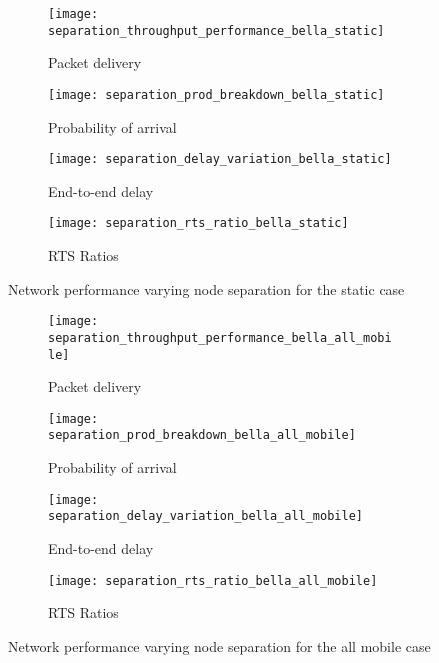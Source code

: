 \begin{figure}[tp!]
  \begin{subfigure}[t]{0.5\textwidth}
    \centering
    \texttt{[image: separation\_throughput\_performance\_bella\_static]}
    \caption{Packet delivery}
    \label{fig:separation_throughput_performance_bella_static}
  \end{subfigure}
  \begin{subfigure}[t]{0.5\textwidth}
    \centering
    \texttt{[image: separation\_prod\_breakdown\_bella\_static]}
    \caption{Probability of arrival}
    \label{fig:separation_prod_breakdown_bella_static}
  \end{subfigure}

  \begin{subfigure}[t]{0.5\textwidth}
    \centering
    \texttt{[image: separation\_delay\_variation\_bella\_static]}
    \caption{End-to-end delay}
    \label{fig:separation_delay_variation_bella_static}
  \end{subfigure}
  \begin{subfigure}[t]{0.5\textwidth}
    \centering
    \texttt{[image: separation\_rts\_ratio\_bella\_static]}
    \caption{RTS Ratios}
    \label{fig:separation_rts_ratio_bella_static}
  \end{subfigure}
  \caption{Network performance varying node separation for the static case}
  \label{fig:separation_bella_static}
\end{figure}


\begin{figure}[bp!]
  \begin{subfigure}[t]{0.5\textwidth}
    \centering
    \texttt{[image: separation\_throughput\_performance\_bella\_all\_mobile]}
    \caption{Packet delivery}
    \label{fig:separation_throughput_performance_bella_all_mobile}
  \end{subfigure}
  \begin{subfigure}[t]{0.5\textwidth}
    \centering
    \texttt{[image: separation\_prod\_breakdown\_bella\_all\_mobile]}
    \caption{Probability of arrival}
    \label{fig:separation_prod_breakdown_bella_all_mobile}
  \end{subfigure}

  \begin{subfigure}[t]{0.5\textwidth}
    \centering
    \texttt{[image: separation\_delay\_variation\_bella\_all\_mobile]}
    \caption{End-to-end delay}
    \label{fig:separation_delay_variation_bella_all_mobile}
  \end{subfigure}
  \begin{subfigure}[t]{0.5\textwidth}
    \centering
    \texttt{[image: separation\_rts\_ratio\_bella\_all\_mobile]}
    \caption{RTS Ratios}
    \label{fig:separation_rts_ratio_bella_all_mobile}
  \end{subfigure}
  \caption{Network performance varying node separation for the all mobile case}
  \label{fig:separation_bella_all_mobile}
\end{figure}


